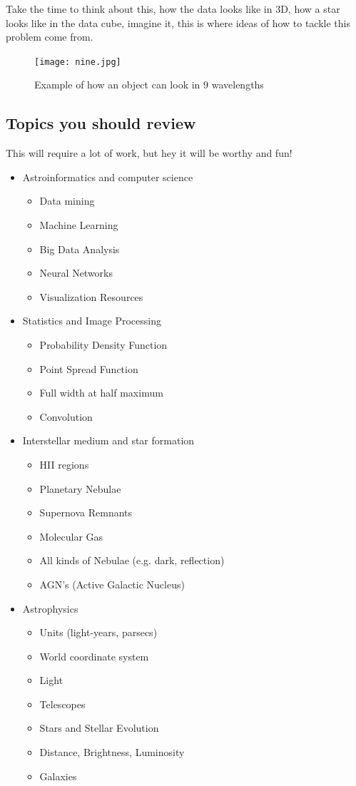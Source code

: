 \documentclass[11pt,fleqn]{book} %
\begin{document}
Take the time to think about this, how the data looks like in 3D, how a star looks like in the data cube, imagine it, this is where ideas of how to tackle this problem come from.
\begin{figure}
	\centering
    \texttt{[image: nine.jpg]}
    \caption{Example of how an object can look in 9 wavelengths}
    \label{fig:nine}
\end{figure}

\subsection{Topics you should review}
This will require a lot of work, but hey it will be worthy and fun!
\begin{itemize}
	\item Astroinformatics and computer science
    	\begin{itemize}
        	\item Data mining
            \item Machine Learning
            \item Big Data Analysis
            \item Neural Networks
            \item Visualization Resources
        \end{itemize}
    \item Statistics and Image Processing
    	\begin{itemize}
        	\item Probability Density Function
            \item Point Spread Function
            \item Full width at half maximum
            \item Convolution
        \end{itemize}
    \item Interstellar medium and star formation
    	\begin{itemize}
        	\item HII regions
            \item Planetary Nebulae
            \item Supernova Remnants
            \item Molecular Gas
            \item All kinds of Nebulae (e.g. dark, reflection)
            \item AGN's (Active Galactic Nucleus)
        \end{itemize}
    \item Astrophysics
    	\begin{itemize}
        	\item Units (light-years, parsecs)
            \item World coordinate system
        	\item Light
            \item Telescopes
            \item Stars and Stellar Evolution
            \item Distance, Brightness, Luminosity
            \item Galaxies
        \end{itemize}
\end{itemize}
\end{document}

